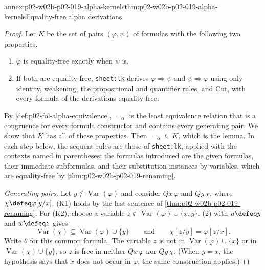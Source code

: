 \begin{annexitem}{annex:p02-w02b-p02-019-alpha-kernels}{thm:p02-w02b-p02-019-alpha-kernels}{Equality-free alpha derivations}
\begin{proof}
Let \(K\) be the set of pairs \((\varphi,\psi)\) of formulas with the
following two properties.
\begin{enumerate}
 \item[(K1)] \(\varphi\) is equality-free exactly when \(\psi\) is.
 \item[(K2)] If both are equality-free, \texttt{sheet:lk} derives
   \(\varphi\Rightarrow\psi\) and \(\psi\Rightarrow\varphi\) using only
   identity, weakening, the propositional and quantifier rules, and Cut,
   with every formula of the derivations equality-free.
\end{enumerate}
By \cref{def:p02-fol-alpha-equivalence}, \(=_{\alpha}\) is the least
equivalence relation that is a congruence for every formula constructor and
contains every generating pair.  We show that \(K\) has all of these
properties.  Then \({=_{\alpha}}\subseteq K\), which is the lemma.  In each
step below, the sequent rules are those of \texttt{sheet:lk}, applied with the
contexts named in parentheses; the formulas introduced are the given
formulas, their immediate subformulas, and their substitution instances by
variables, which are equality-free by
\cref{thm:p02-w02b-p02-019-renaming}.

\emph{Generating pairs.}  Let \(y\notin\operatorname{Var}(\varphi)\) and
consider \(Qx\,\varphi\) and \(Qy\,\chi\), where \(\chi\defeq\varphi[y/x]\).
(K1) holds by the last sentence of \cref{thm:p02-w02b-p02-019-renaming}.  For
(K2), choose a variable \(z\notin\operatorname{Var}(\varphi)\cup\{x,y\}\).
(2) with \(u\defeq y\) and \(w\defeq z\)
gives
\[
 \operatorname{Var}(\chi)\subseteq\operatorname{Var}(\varphi)\cup\{y\}
 \qquad\text{and}\qquad
 \chi[z/y]=\varphi[z/x].
\]
Write \(\theta\) for this common formula.  The variable \(z\) is not in
\(\operatorname{Var}(\varphi)\cup\{x\}\) or in
\(\operatorname{Var}(\chi)\cup\{y\}\), so \(z\) is free in neither
\(Qx\,\varphi\) nor \(Qy\,\chi\).  (When \(y=x\), the hypothesis says that
\(x\) does not occur in \(\varphi\); the same construction applies.)


\end{proof}
\end{annexitem}
